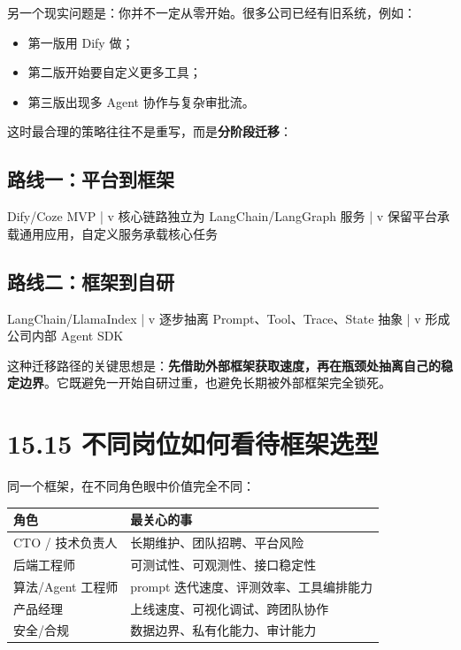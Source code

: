 另一个现实问题是：你并不一定从零开始。很多公司已经有旧系统，例如：


\begin{itemize}[leftmargin=2em]
\item 第一版用 Dify 做；
\item 第二版开始要自定义更多工具；
\item 第三版出现多 Agent 协作与复杂审批流。
\end{itemize}

这时最合理的策略往往不是重写，而是\textbf{分阶段迁移}：


\subsection{路线一：平台到框架}

\begin{codeblock}
Dify/Coze MVP
    |
    v
核心链路独立为 LangChain/LangGraph 服务
    |
    v
保留平台承载通用应用，自定义服务承载核心任务
\end{codeblock}

\subsection{路线二：框架到自研}

\begin{codeblock}
LangChain/LlamaIndex
    |
    v
逐步抽离 Prompt、Tool、Trace、State 抽象
    |
    v
形成公司内部 Agent SDK
\end{codeblock}

这种迁移路径的关键思想是：\textbf{先借助外部框架获取速度，再在瓶颈处抽离自己的稳定边界}。它既避免一开始自研过重，也避免长期被外部框架完全锁死。


\section{15.15 不同岗位如何看待框架选型}

同一个框架，在不同角色眼中价值完全不同：


\begingroup
\scriptsize
\setlength{\tabcolsep}{3pt}
\begin{longtable}{|p{}|p{}|}
\hline
角色 & 最关心的事 \\ \hline
CTO / 技术负责人 & 长期维护、团队招聘、平台风险 \\ \hline
后端工程师 & 可测试性、可观测性、接口稳定性 \\ \hline
算法/Agent 工程师 & prompt 迭代速度、评测效率、工具编排能力 \\ \hline
产品经理 & 上线速度、可视化调试、跨团队协作 \\ \hline
安全/合规 & 数据边界、私有化能力、审计能力 \\ \hline
\end{longtable}
\endgroup

